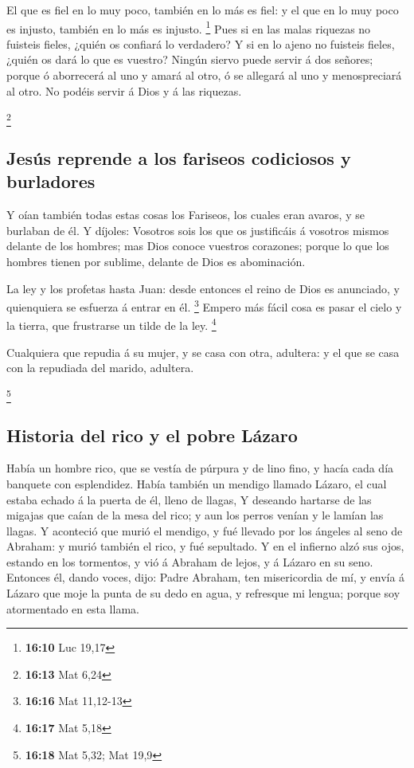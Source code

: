  El que es fiel en lo muy poco, también en lo más es
fiel: y el que en lo muy poco es injusto, también en lo más es injusto.
\footnote{\textbf{16:10} Luc 19,17}  Pues si en las malas
riquezas no fuisteis fieles, ¿quién os confiará lo verdadero?
 Y si en lo ajeno no fuisteis fieles, ¿quién os dará lo
que es vuestro?  Ningún siervo puede servir á dos
señores; porque ó aborrecerá al uno y amará al otro, ó se allegará al
uno y menospreciará al otro. No podéis servir á Dios y á las riquezas.

\footnote{\textbf{16:13} Mat 6,24}

\hypertarget{jesuxfas-reprende-a-los-fariseos-codiciosos-y-burladores}{%
\subsection{Jesús reprende a los fariseos codiciosos y
burladores}\label{jesuxfas-reprende-a-los-fariseos-codiciosos-y-burladores}}

 Y oían también todas estas cosas los Fariseos, los
cuales eran avaros, y se burlaban de él.  Y díjoles:
Vosotros sois los que os justificáis á vosotros mismos delante de los
hombres; mas Dios conoce vuestros corazones; porque lo que los hombres
tienen por sublime, delante de Dios es abominación.

 La ley y los profetas hasta Juan: desde entonces el
reino de Dios es anunciado, y quienquiera se esfuerza á entrar en él.
\footnote{\textbf{16:16} Mat 11,12-13}  Empero más fácil
cosa es pasar el cielo y la tierra, que frustrarse un tilde de la ley.
\footnote{\textbf{16:17} Mat 5,18}

 Cualquiera que repudia á su mujer, y se casa con otra,
adultera: y el que se casa con la repudiada del marido, adultera.

\footnote{\textbf{16:18} Mat 5,32; Mat 19,9}

\hypertarget{historia-del-rico-y-el-pobre-luxe1zaro}{%
\subsection{Historia del rico y el pobre
Lázaro}\label{historia-del-rico-y-el-pobre-luxe1zaro}}

 Había un hombre rico, que se vestía de púrpura y de lino
fino, y hacía cada día banquete con esplendidez.  Había
también un mendigo llamado Lázaro, el cual estaba echado á la puerta de
él, lleno de llagas,  Y deseando hartarse de las migajas
que caían de la mesa del rico; y aun los perros venían y le lamían las
llagas.  Y aconteció que murió el mendigo, y fué llevado
por los ángeles al seno de Abraham: y murió también el rico, y fué
sepultado.  Y en el infierno alzó sus ojos, estando en
los tormentos, y vió á Abraham de lejos, y á Lázaro en su seno.
 Entonces él, dando voces, dijo: Padre Abraham, ten
misericordia de mí, y envía á Lázaro que moje la punta de su dedo en
agua, y refresque mi lengua; porque soy atormentado en esta llama.

